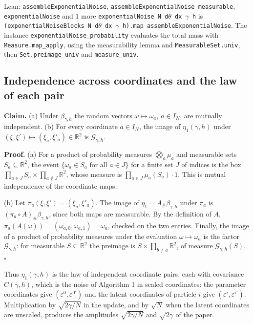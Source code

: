 \documentclass[11pt,a4paper]{report}
\begin{document}
\begin{leanbox}{Lean: \texttt{assembleExponentialNoise}, \texttt{assembleExponentialNoise\_\allowbreak{}measurable}, \texttt{exponentialNoise} and 1 more}
\texttt{exponential\allowbreak{}Noise N d\ensuremath{\theta} dx \ensuremath{\gamma} h} is \texttt{(exponential\allowbreak{}Noise\allowbreak{}Blocks N d\ensuremath{\theta} dx \ensuremath{\gamma} h).\allowbreak{}map assemble\allowbreak{}Exponential\allowbreak{}Noise}. The instance \texttt{exponential\allowbreak{}Noise\_\allowbreak{}probability} evaluates the total mass with \texttt{Measure.\allowbreak{}map\_\allowbreak{}apply}, using the measurability lemma and \texttt{Measurable\allowbreak{}Set.\allowbreak{}univ}, then \texttt{Set.\allowbreak{}preimage\_\allowbreak{}univ} and \texttt{measure\_\allowbreak{}univ}.
\end{leanbox}
\subsection{\texorpdfstring{Independence across coordinates and the law of each pair}{Independence across coordinates and the law of each pair}}
\label{report-step-KIPLMC-Noise-lean-3}


\textbf{Claim.} (a) Under \(\beta_{\gamma,h}\) the random vectors \(\omega\mapsto\omega_a\), \(a\in I_N\), are mutually independent. (b) For every coordinate \(a\in I_N\), the image of \(\eta_1(\gamma,h)\) under \((\xi,\xi')\mapsto(\xi_a,\xi'_a)\in\mathbb R^2\) is \(\mathcal G_{\gamma,h}\).




\textbf{Proof.} (a) For a product of probability measures \(\bigotimes_a\mu_a\) and measurable sets \(S_a\subseteq\mathbb R^2\), the event \(\{\omega_a\in S_a\text{ for all }a\in J\}\) for a finite set \(J\) of indices is the box \(\prod_{a\in J}S_a\times\prod_{a\notin J}\mathbb R^2\), whose measure is \(\prod_{a\in J}\mu_a(S_a)\cdot1\). This is mutual independence of the coordinate maps.




(b) Let \(\pi_a(\xi,\xi')=(\xi_a,\xi'_a)\). The image of \(\eta_1=A_\#\beta_{\gamma,h}\) under \(\pi_a\) is \((\pi_a\circ A)_\#\beta_{\gamma,h}\), since both maps are measurable. By the definition of \(A\), \(\pi_a(A(\omega))=(\omega_{a,0},\omega_{a,1})=\omega_a\), checked on the two entries. Finally, the image of a product of probability measures under the evaluation \(\omega\mapsto\omega_a\) is the factor \(\mathcal G_{\gamma,h}\): for measurable \(S\subseteq\mathbb R^2\) the preimage is \(S\times\prod_{b\ne a}\mathbb R^2\), of measure \(\mathcal G_{\gamma,h}(S)\). \(\square\)




Thus \(\eta_1(\gamma,h)\) is the law of independent coordinate pairs, each with covariance \(C(\gamma,h)\), which is the noise of Algorithm 1 in scaled coordinates: the parameter coordinates give \((\varepsilon^0,\varepsilon^{0\prime})\) and the latent coordinates of particle \(i\) give \((\varepsilon^i,\varepsilon^{i\prime})\). Multiplication by \(\sqrt{2\gamma/N}\) in the update, and by \(\sqrt N\) when the latent coordinates are unscaled, produces the amplitudes \(\sqrt{2\gamma/N}\) and \(\sqrt{2\gamma}\) of the paper.
\end{document}

